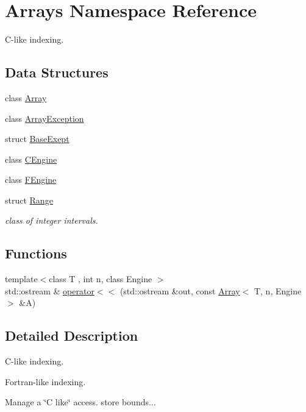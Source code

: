 \hypertarget{namespaceArrays}{}\section{Arrays Namespace Reference}
\label{namespaceArrays}


C-\/like indexing.  


\subsection*{Data Structures}
\begin{DoxyCompactItemize}
\item 
class \hyperlink{classArrays_1_1Array}{Array}
\item 
class \hyperlink{classArrays_1_1ArrayException}{Array\+Exception}
\item 
struct \hyperlink{structArrays_1_1BaseExept}{Base\+Exept}
\item 
class \hyperlink{classArrays_1_1CEngine}{C\+Engine}
\item 
class \hyperlink{classArrays_1_1FEngine}{F\+Engine}
\item 
struct \hyperlink{structArrays_1_1Range}{Range}
\begin{DoxyCompactList}\small\item\em class of integer intervals. \end{DoxyCompactList}\end{DoxyCompactItemize}
\subsection*{Functions}
\begin{DoxyCompactItemize}
\item 
{\footnotesize template$<$class T , int n, class Engine $>$ }\\std\+::ostream \& \hyperlink{namespaceArrays_aab9f03b321449d8046150f3634b23e21}{operator$<$$<$} (std\+::ostream \&out, const \hyperlink{classArrays_1_1Array}{Array}$<$ T, n, Engine $>$ \&A)
\end{DoxyCompactItemize}


\subsection{Detailed Description}
C-\/like indexing. 

Fortran-\/like indexing.

Manage a \char`\"{}\+C like\char`\"{} access. store bounds...

